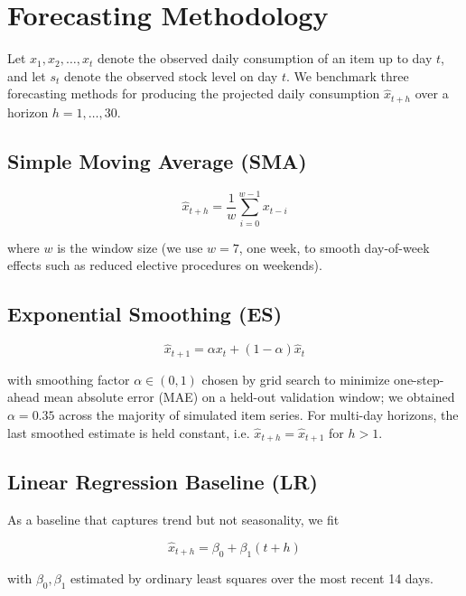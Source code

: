\documentclass[conference]{IEEEtran}
\begin{document}
\section{Forecasting Methodology}

Let $x_1, x_2, \dots, x_t$ denote the observed daily consumption of an item up to day $t$, and let $s_t$ denote the observed stock level on day $t$. We benchmark three forecasting methods for producing the projected daily consumption $\hat{x}_{t+h}$ over a horizon $h = 1, \dots, 30$.

\subsection{Simple Moving Average (SMA)}

\begin{equation}
\hat{x}_{t+h} = \frac{1}{w}\sum_{i=0}^{w-1} x_{t-i}
\label{eq:sma}
\end{equation}

where $w$ is the window size (we use $w=7$, one week, to smooth day-of-week effects such as reduced elective procedures on weekends).

\subsection{Exponential Smoothing (ES)}

\begin{equation}
\hat{x}_{t+1} = \alpha x_t + (1-\alpha)\hat{x}_t
\label{eq:es}
\end{equation}

with smoothing factor $\alpha \in (0,1)$ chosen by grid search to minimize one-step-ahead mean absolute error (MAE) on a held-out validation window; we obtained $\alpha = 0.35$ across the majority of simulated item series. For multi-day horizons, the last smoothed estimate is held constant, i.e. $\hat{x}_{t+h} = \hat{x}_{t+1}$ for $h > 1$.

\subsection{Linear Regression Baseline (LR)}

As a baseline that captures trend but not seasonality, we fit

\begin{equation}
\hat{x}_{t+h} = \beta_0 + \beta_1 (t+h)
\label{eq:lr}
\end{equation}

with $\beta_0, \beta_1$ estimated by ordinary least squares over the most recent 14 days.
\end{document}
